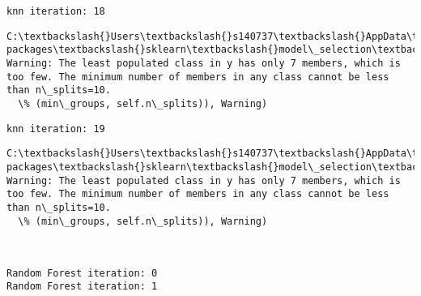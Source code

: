 \documentclass[11pt]{article}
\begin{document}
    \begin{Verbatim}[commandchars=\\\{\}]
knn iteration: 18 

    \end{Verbatim}

    \begin{Verbatim}[commandchars=\\\{\}]
C:\textbackslash{}Users\textbackslash{}s140737\textbackslash{}AppData\textbackslash{}Local\textbackslash{}Continuum\textbackslash{}anaconda3\textbackslash{}lib\textbackslash{}site-packages\textbackslash{}sklearn\textbackslash{}model\_selection\textbackslash{}\_split.py:605: Warning: The least populated class in y has only 7 members, which is too few. The minimum number of members in any class cannot be less than n\_splits=10.
  \% (min\_groups, self.n\_splits)), Warning)

    \end{Verbatim}

    \begin{Verbatim}[commandchars=\\\{\}]
knn iteration: 19 

    \end{Verbatim}

    \begin{Verbatim}[commandchars=\\\{\}]
C:\textbackslash{}Users\textbackslash{}s140737\textbackslash{}AppData\textbackslash{}Local\textbackslash{}Continuum\textbackslash{}anaconda3\textbackslash{}lib\textbackslash{}site-packages\textbackslash{}sklearn\textbackslash{}model\_selection\textbackslash{}\_split.py:605: Warning: The least populated class in y has only 7 members, which is too few. The minimum number of members in any class cannot be less than n\_splits=10.
  \% (min\_groups, self.n\_splits)), Warning)

    \end{Verbatim}

    \begin{center}
    \end{center}
    { \hspace*{\fill} \\}
    
    \begin{Verbatim}[commandchars=\\\{\}]
Random Forest iteration: 0 
Random Forest iteration: 1 

    \end{Verbatim}
\end{document}
